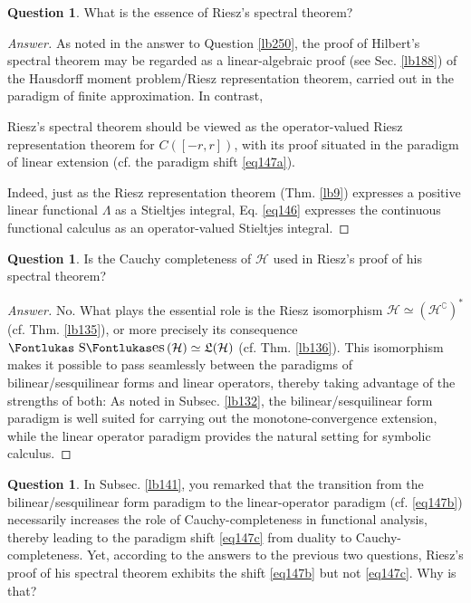 \documentclass[12pt,b5paper,notitlepage]{article}
\theoremstyle{definition}
\newtheorem{question}[df]{Question}
\theoremstyle{plain}
\DeclareMathOperator{\Ses}{\text{\Fontlukas S}\text{\kern -0pt {\Fontlukas\large es}}\,}
\newcommand{\fk}{\mathfrak}
\newcommand{\Co}{\complement}
\newcommand{\MH}{\mathcal H}
\numberwithin{equation}{section}
\begin{document}
\begin{question}\label{lb271}
What is the essence of Riesz's spectral theorem?
\end{question}


\begin{proof}[Answer]
As noted in the answer to Question \ref{lb250}, the proof of Hilbert's spectral theorem may be regarded as a linear-algebraic proof (see Sec. \ref{lb188}) of the Hausdorff moment problem/Riesz representation theorem, carried out in the paradigm of finite approximation. In contrast,
\begin{tcolorbox}
Riesz's spectral theorem should be viewed as the operator-valued Riesz representation theorem for $C([-r,r])$, with its proof situated in the paradigm of linear extension (cf. the paradigm shift \eqref{eq147a}).
\end{tcolorbox}
Indeed, just as the Riesz representation theorem (Thm. \ref{lb9}) expresses a positive linear functional $\Lambda$ as a Stieltjes integral, Eq. \eqref{eq146} expresses the continuous functional calculus as an operator-valued Stieltjes integral.
\end{proof}


\begin{question}\label{lb270}
Is the Cauchy completeness of $\MH$ used in Riesz's proof of his spectral theorem?
\end{question}



\begin{proof}[Answer]
No. What plays the essential role is the Riesz isomorphism $\MH\simeq(\MH^\Co)^*$ (cf. Thm. \ref{lb135}), or more precisely its consequence $\Ses(\MH)\simeq\fk L(\MH)$ (cf. Thm. \ref{lb136}). This isomorphism makes it possible to pass seamlessly between the paradigms of bilinear/sesquilinear forms and linear operators, thereby taking advantage of the strengths of both: As noted in Subsec. \ref{lb132}, the bilinear/sesquilinear form paradigm is well suited for carrying out the monotone-convergence extension, while the linear operator paradigm provides the natural setting for symbolic calculus.
\end{proof}




\begin{question}
In Subsec. \ref{lb141}, you remarked that the transition from the bilinear/sesquilinear form paradigm to the linear-operator paradigm (cf. \eqref{eq147b}) necessarily increases the role of Cauchy-completeness in functional analysis, thereby leading to the paradigm shift \eqref{eq147c} from duality to Cauchy-completeness. Yet, according to the answers to the previous two questions, Riesz's proof of his spectral theorem exhibits the shift \eqref{eq147b} but not \eqref{eq147c}. Why is that?
\end{question}
\end{document}
